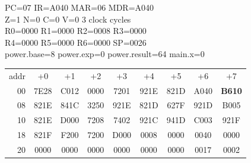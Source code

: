 \begin{tcolorbox}[stepbox, title={Step 33 \hfill PC 06 \quad CMP R1, R0}]
PC=07 IR=A040 MAR=06 MDR=A040\\
Z=1 N=0 C=0 V=0 \hfill \textcolor{dim}{3 clock cycles}\\
R0=0000 R1=0000 R2=0008 R3=0000\\
R4=0000 R5=0000 R6=0000 SP=0026\\
\textcolor{dim}{power.base=8  power.exp=0  power.result=64  main.x=0}\\[1pt]
{\setlength{\tabcolsep}{1.6pt}\begin{tabular}{@{}r*{8}{c}@{}}
\textcolor{dim}{addr} & \textcolor{dim}{+0} & \textcolor{dim}{+1} & \textcolor{dim}{+2} & \textcolor{dim}{+3} & \textcolor{dim}{+4} & \textcolor{dim}{+5} & \textcolor{dim}{+6} & \textcolor{dim}{+7}\\
\textcolor{dim}{00} & 7E28 & C012 & 0000 & 7201 & 921E & 821D & A040 & \cellcolor{pcc}\textbf{B610}\\
\textcolor{dim}{08} & 821E & 841C & 3250 & 921E & 821D & 627F & 921D & B005\\
\textcolor{dim}{10} & 821E & D000 & 7208 & 7402 & 921C & 941D & C003 & 921F\\
\textcolor{dim}{18} & 821F & F200 & 7200 & D000 & \cellcolor{datac}0008 & \cellcolor{datac}0000 & \cellcolor{datac}0040 & \cellcolor{datac}0000\\
\textcolor{dim}{20} & \cellcolor{stackc}0000 & \cellcolor{stackc}0000 & \cellcolor{stackc}0000 & \cellcolor{stackc}0000 & \cellcolor{stackc}0000 & \cellcolor{stackc}0000 & \cellcolor{stackc}0017 & \cellcolor{stackc}0002\\
\end{tabular}}
\end{tcolorbox}\par\vspace{3pt}
